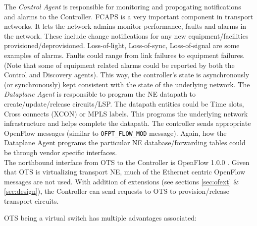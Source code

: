 \documentclass{sig-alternate-10pt}
\begin{document}
	The \textit{Control Agent} is responsible for monitoring and propogating notifications and alarms to the
	Controller. FCAPS is a very important component in transport networks. It lets the network admins monitor
	performance, faults and alarms in the network. These include change notifications for any new equipment/facilities 
	provisioned/deprovisioned. Loss-of-light, Loss-of-sync, Loss-of-signal are some 
	examples of alarms. Faults could range from link failures to equipment failures. (Note that some of
	equipment related alarms could be reported by both the Control and Discovery agents). This way, the
	controller's state is asynchronously (or synchronously) kept consistent with the state of the underlying
	network. The \textit{Dataplane Agent} is responsible to program the NE datapath to create/update/release
	circuits/LSP. The datapath entities could be Time slots, Cross connects (XCON) or MPLS labels. This
	programs the underlying network infrastructure and helps complete the datapath. The controller sends
	appropriate OpenFlow messages (similar to \texttt{OFPT\_FLOW\_MOD} message). Again, how the Dataplane
	Agent programs the particular NE database/forwarding tables could be through vendor specific interfaces. \\
	
	The northbound interface from OTS to the Controller is OpenFlow 1.0.0 \cite{OF1.0}. Given that OTS is
	virtualizing transport NE, much of the Ethernet centric OpenFlow messages are not used. With addition of
	extensions (see sections \ref{sec:ofext} \& \ref{sec:design}), the Controller can send requests to OTS
	to provision/release transport circuits.
	
	OTS being a virtual switch has multiple advantages associated:
\end{document}
